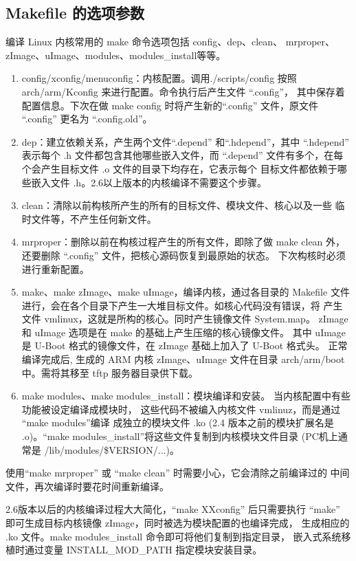 \subsection{Makefile 的选项参数}
编译 Linux 内核常用的 make 命令选项包括 config、dep、clean、
mrproper、zImage、uImage、modules、modules\_install等等。
\begin{enumerate}
    \item config/xconfig/menuconfig：内核配置。调用./scripts/config 按照
        arch/arm/Kconfig 来进行配置。命令执行后产生文件 ``.config''，
        其中保存着配置信息。下次在做 make config 时将产生新的``.config''
        文件，原文件 ``.config'' 更名为 ``.config.old''。
    \item dep：建立依赖关系，产生两个文件``.depend'' 和``.hdepend''，其中
        ``.hdepend'' 表示每个 .h 文件都包含其他哪些嵌入文件，而 ``.depend''
        文件有多个，在每个会产生目标文件 .o 文件的目录下均存在，它表示每个
        目标文件都依赖于哪些嵌入文件 .h。2.6以上版本的内核编译不需要这个步骤。
    \item clean：清除以前构核所产生的所有的目标文件、模块文件、核心以及一些
		临时文件等，不产生任何新文件。
    \item mrproper：删除以前在构核过程产生的所有文件，即除了做 make clean 外，
		还要删除 ``.config'' 文件，把核心源码恢复到最原始的状态。
        下次构核时必须进行重新配置。
    \item make、make zImage、make uImage，编译内核，通过各目录的 Makefile
		文件进行，会在各个目录下产生一大堆目标文件。如核心代码没有错误，将
        产生文件 vmlinux，这就是所构的核心。同时产生镜像文件 System.map。
        zImage 和 uImage 选项是在 make 的基础上产生压缩的核心镜像文件。
        其中 uImage 是 U-Boot 格式的镜像文件，在 zImage 基础上加入了
        U-Boot 格式头。
		正常编译完成后, 生成的 ARM 内核 zImage、uImage 文件在目录
        arch/arm/boot 中。需将其移至 tftp 服务器目录供下载。
    \item make modules、make modules\_install：模块编译和安装。
        当内核配置中有些功能被设定编译成模块时，
        这些代码不被编入内核文件 vmlinuz，而是通过 ``make modules''编译
        成独立的模块文件 .ko (2.4 版本之前的模块扩展名是 .o)。``make
        modules\_install''将这些文件复制到内核模块文件目录 (PC机上通常是
		/lib/modules/\$VERSION/...)。
\end{enumerate}
使用``make mrproper'' 或 ``make clean'' 时需要小心，它会清除之前编译过的
中间文件，再次编译时要花时间重新编译。

2.6版本以后的内核编译过程大大简化，``make XXconfig'' 后只需要执行
``make'' 即可生成目标内核镜像 zImage，同时被选为模块配置的也编译完成，
生成相应的 .ko 文件。make modules\_install 命令即可将他们复制到指定目录，
嵌入式系统移植时通过变量 INSTALL\_MOD\_PATH 指定模块安装目录。

